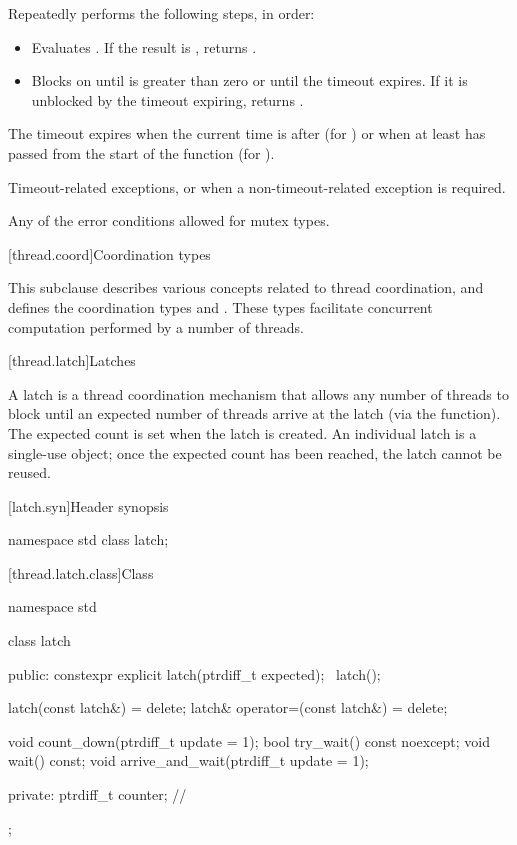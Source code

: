 \begin{itemdescr}
\pnum
\effects
Repeatedly performs the following steps, in order:
\begin{itemize}
\item
  Evaluates .
  If the result is , returns .
\item
  Blocks on 
  until  is greater than zero or until the timeout expires.
  If it is unblocked by the timeout expiring, returns .
\end{itemize}
The timeout expires
when the current time is after  (for )
or when at least  has passed
from the start of the function (for ).

\pnum
\throws
Timeout-related exceptions, or 
when a non-timeout-related exception is required.

\pnum
\errors
Any of the error conditions
allowed for mutex types.
\end{itemdescr}

[thread.coord]{Coordination types}

\pnum
This subclause describes various concepts related to thread coordination, and
defines the coordination types  and .
These types facilitate concurrent computation performed by a number of threads.

[thread.latch]{Latches}

\pnum
A latch is a thread coordination mechanism
that allows any number of threads to block
until an expected number of threads arrive at the latch
(via the  function).
The expected count is set when the latch is created.
An individual latch is a single-use object;
once the expected count has been reached, the latch cannot be reused.

[latch.syn]{Header  synopsis}

%
\begin{codeblock}
namespace std {
  class latch;
}
\end{codeblock}

[thread.latch.class]{Class }

\begin{codeblock}
namespace std {
  class latch {
  public:
    constexpr explicit latch(ptrdiff_t expected);
    ~latch();

    latch(const latch&) = delete;
    latch& operator=(const latch&) = delete;

    void count_down(ptrdiff_t update = 1);
    bool try_wait() const noexcept;
    void wait() const;
    void arrive_and_wait(ptrdiff_t update = 1);

  private:
    ptrdiff_t counter;  // \expos
  };
}
\end{codeblock}

